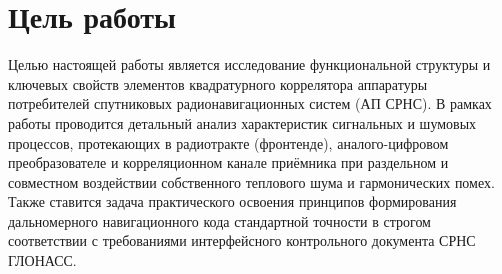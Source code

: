 \section{Цель работы}

Целью настоящей работы является исследование функциональной структуры и ключевых свойств элементов квадратурного коррелятора аппаратуры потребителей спутниковых радионавигационных систем (АП СРНС). В рамках работы проводится детальный анализ характеристик сигнальных и шумовых процессов, протекающих в радиотракте (фронтенде), аналого-цифровом преобразователе и корреляционном канале приёмника при раздельном и совместном воздействии собственного теплового шума и гармонических помех. Также ставится задача практического освоения принципов формирования дальномерного навигационного кода стандартной точности в строгом соответствии с требованиями интерфейсного контрольного документа СРНС ГЛОНАСС.